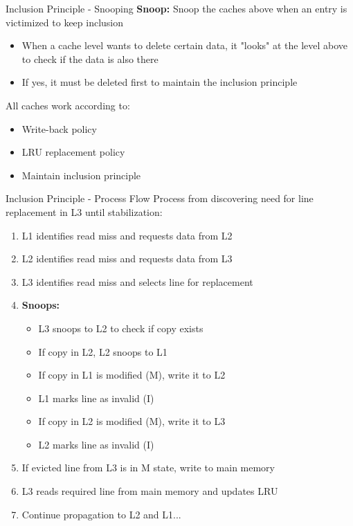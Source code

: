 \documentclass[aspectratio=169,12pt]{beamer}
\begin{document}
\begin{frame}{Inclusion Principle - Snooping}
\textbf{Snoop:} Snoop the caches above when an entry is victimized to keep inclusion

\begin{itemize}
    \item When a cache level wants to delete certain data, it "looks" at the level above to check if the data is also there
    \item If yes, it must be deleted first to maintain the inclusion principle
\end{itemize}

All caches work according to:
\begin{itemize}
    \item Write-back policy
    \item LRU replacement policy
    \item Maintain inclusion principle
\end{itemize}
\end{frame}

\begin{frame}{Inclusion Principle - Process Flow}
\small
Process from discovering need for line replacement in L3 until stabilization:

\begin{enumerate}
    \item L1 identifies read miss and requests data from L2
    \item L2 identifies read miss and requests data from L3
    \item L3 identifies read miss and selects line for replacement
    \item \textbf{Snoops:}
    \begin{itemize}
        \item L3 snoops to L2 to check if copy exists
        \item If copy in L2, L2 snoops to L1
        \item If copy in L1 is modified (M), write it to L2
        \item L1 marks line as invalid (I)
        \item If copy in L2 is modified (M), write it to L3
        \item L2 marks line as invalid (I)
    \end{itemize}
    \item If evicted line from L3 is in M state, write to main memory
    \item L3 reads required line from main memory and updates LRU
    \item Continue propagation to L2 and L1...
\end{enumerate}
\end{frame}
\end{document}

